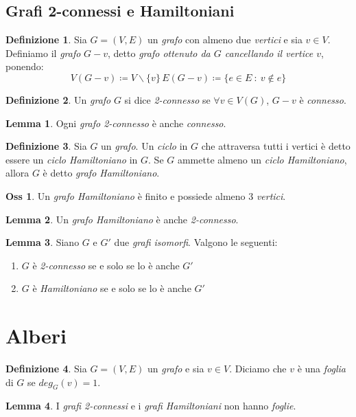 \documentclass[12pt, a4paper]{report}
\theoremstyle{definition}
\newtheorem{definition}{Definizione}[section]
\newtheorem{lemma}{Lemma}[section]
\newtheorem{observation}{Oss}[section]
\begin{document}
\subsection{Grafi 2-connessi e Hamiltoniani}
\begin{definition}
    Sia $G=(V,E)$ un \emph{grafo} con almeno due \emph{vertici} e sia $v\in V$.
    Definiamo il \emph{grafo} $G-v$, detto \emph{grafo ottenuto da $G$ cancellando
    il vertice $v$}, ponendo:
    \[V(G-v)\coloneqq V\backslash\{v\}\, E(G-v)\coloneqq\{e\in E\ :\ v\notin e\}\]
\end{definition}

\begin{definition}
    Un \emph{grafo} $G$ si dice \emph{2-connesso} se $\forall v\in V(G)$, $G-v$ è
    \emph{connesso}.
\end{definition}
\begin{lemma}
    Ogni \emph{grafo 2-connesso} è anche \emph{connesso}.
\end{lemma}

\begin{definition}
    Sia $G$ un \emph{grafo}. Un \emph{ciclo} in $G$ che attraversa tutti i vertici
    è detto essere un \emph{ciclo Hamiltoniano} in $G$. Se $G$ ammette almeno un
    \emph{ciclo Hamiltoniano}, allora $G$ è detto \emph{grafo Hamiltoniano}.
\end{definition}

\begin{observation}
    Un \emph{grafo Hamiltoniano} è finito e possiede almeno 3 \emph{vertici}.
\end{observation}
\begin{lemma}
    Un \emph{grafo Hamiltoniano} è anche \emph{2-connesso}.
\end{lemma}

\begin{lemma}
    Siano $G$ e $G'$ due \emph{grafi isomorfi}. Valgono le seguenti:
    \begin{enumerate}[label=(\roman*)]
        \item $G$ è \emph{2-connesso} se e solo se lo è anche $G'$
        \item $G$ è \emph{Hamiltoniano} se e solo se lo è anche $G'$
    \end{enumerate}
\end{lemma}

\section{Alberi}
\begin{definition}
    Sia $G=(V,E)$ un \emph{grafo} e sia $v\in V$. Diciamo che $v$ è una \emph{foglia}
    di $G$ se $deg_G(v)=1$.
\end{definition}
\begin{lemma}
    I \emph{grafi 2-connessi} e i \emph{grafi Hamiltoniani} non hanno \emph{foglie}.
\end{lemma}
\end{document}
